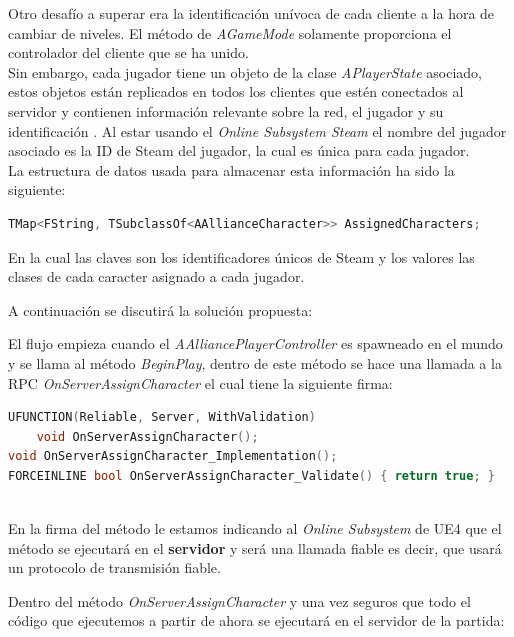 Otro desafío a superar era la identificación unívoca de cada cliente a la hora de cambiar de niveles. El método  de \textit{AGameMode} solamente proporciona el controlador del cliente que se ha unido. \\

Sin embargo, cada jugador tiene un objeto de la clase \textit{APlayerState} asociado, estos objetos están replicados en todos los clientes que estén conectados al servidor y contienen información relevante sobre la red, el jugador y su identificación \cite{13}. Al estar usando el \textit{Online Subsystem Steam} el nombre del jugador asociado es la ID de Steam del jugador, la cual es única para cada jugador. \\

La estructura de datos usada para almacenar esta información ha sido la siguiente:

\begin{lstlisting}[language=c++,caption={Declaración del mapa de jugadores a caracteres},captionpos=b,label={lstAssignedMap}]
TMap<FString, TSubclassOf<AAllianceCharacter>> AssignedCharacters;
\end{lstlisting}

En la cual las claves son los identificadores únicos de Steam y los valores las clases de cada caracter asignado a cada jugador.


A continuación se discutirá la solución propuesta:

El flujo empieza cuando el \textit{AAlliancePlayerController} es spawneado en el mundo y se llama al método \textit{BeginPlay}, dentro de este método se hace una llamada a la \ac{RPC} \textit{OnServerAssignCharacter} el cual tiene la siguiente firma:

\begin{lstlisting}[language=c++,caption={Firma del método OnServerAssignCharacter},captionpos=b,label={lstAssignFirma}]
UFUNCTION(Reliable, Server, WithValidation)
	void OnServerAssignCharacter();
void OnServerAssignCharacter_Implementation();
FORCEINLINE bool OnServerAssignCharacter_Validate() { return true; }
\end{lstlisting} \\

En la firma del método le estamos indicando al \textit{Online Subsystem} de \ac{UE4} que el método se ejecutará en el \textbf{servidor} y será una llamada fiable es decir, que usará un protocolo de transmisión fiable.

Dentro del método \textit{OnServerAssignCharacter} y una vez seguros que todo el código que ejecutemos a partir de ahora se ejecutará en el servidor de la partida:

